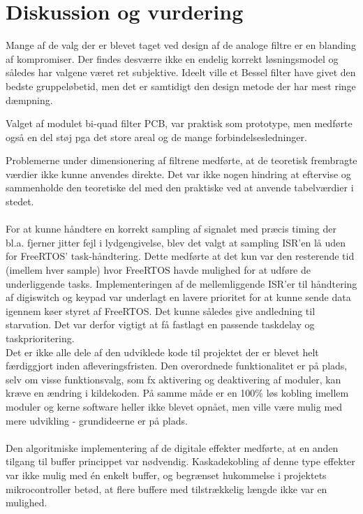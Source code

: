 \chapter{Diskussion og vurdering}\label{kap:diskussion}
\vspace*{.5cm}

Mange af de valg der er blevet taget ved design af de analoge filtre er en blanding af kompromiser. Der findes desværre ikke en endelig korrekt løsningsmodel og således har valgene været ret subjektive.
Ideelt ville et Bessel filter have givet den bedste gruppeløbetid, men det er samtidigt den design metode der har mest ringe dæmpning.

Valget af modulet bi-quad filter PCB, var praktisk som prototype, men medførte også en del støj pga det store areal og de mange forbindelsesledninger.

Problemerne under dimensionering af filtrene medførte, at de teoretisk frembragte værdier ikke kunne anvendes direkte. Det var ikke nogen hindring at eftervise og sammenholde den teoretiske del med den praktiske ved at anvende tabelværdier i stedet.
\\
\\
For at kunne håndtere en korrekt sampling af signalet med præcis timing der bl.a. fjerner jitter fejl i lydgengivelse, blev det valgt at sampling ISR'en lå uden for FreeRTOS' task-håndtering. 
Dette medførte at det kun var den resterende tid (imellem hver sample) hvor FreeRTOS havde mulighed for at udføre de underliggende tasks.
Implementeringen af de mellemliggende ISR'er til håndtering af digiswitch og keypad var underlagt en lavere prioritet for at kunne sende data igennem køer styret af FreeRTOS. Det kunne således give andledning til starvation. 
Det var derfor vigtigt at få fastlagt en passende taskdelay og taskprioritering.    
\\
Det er ikke alle dele af den udviklede kode til projektet der er blevet helt færdiggjort inden afleveringsfristen.
Den overordnede funktionalitet er på plads, selv om visse funktionsvalg, som fx aktivering og deaktivering af moduler, kan kræve en ændring i kildekoden.
På samme måde er en 100\% løs kobling imellem moduler og kerne software heller ikke blevet opnået, men ville være mulig med mere udvikling - grundideerne er på plads. 
\\
\\
Den algoritmiske implementering af de digitale effekter medførte, at en anden tilgang til buffer princippet var nødvendig.
Kaskadekobling af denne type effekter var ikke mulig med én enkelt buffer, og begrænset hukommelse i projektets mikrocontroller betød, at flere buffere med tilstrækkelig længde ikke var en mulighed.

